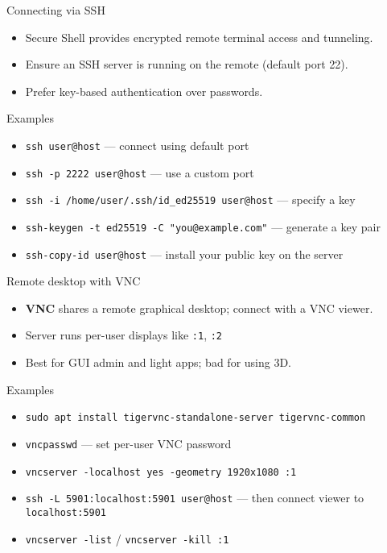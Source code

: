 \documentclass{beamer}
\begin{document}
\begin{frame}{Connecting via SSH}
  \begin{itemize}
    \item Secure Shell provides encrypted remote terminal access and tunneling.
    \item Ensure an SSH server is running on the remote (default port 22).
    \item Prefer key-based authentication over passwords.
  \end{itemize}
  \begin{exampleblock}{Examples}
    \begin{itemize}
      \item \texttt{ssh user@host} — connect using default port
      \item \texttt{ssh -p 2222 user@host} — use a custom port
      \item \texttt{ssh -i /home/user/.ssh/id\_ed25519 user@host} — specify a key
      \item \texttt{ssh-keygen -t ed25519 -C "you@example.com"} — generate a key pair
      \item \texttt{ssh-copy-id user@host} — install your public key on the server
    \end{itemize}
  \end{exampleblock}
\end{frame}

\begin{frame}{Remote desktop with VNC}
  \begin{itemize}
    \item \textbf{VNC} shares a remote graphical desktop; connect with a VNC viewer.
    \item Server runs per-user displays like \texttt{:1}, \texttt{:2}
    \item Best for GUI admin and light apps; bad for using 3D.
  \end{itemize}
  \begin{exampleblock}{Examples}
    \begin{itemize}
      \item \texttt{sudo apt install tigervnc-standalone-server tigervnc-common}
      \item \texttt{vncpasswd} — set per-user VNC password
      \item \texttt{vncserver -localhost yes -geometry 1920x1080 :1}
      \item \texttt{ssh -L 5901:localhost:5901 user@host} — then connect viewer to \texttt{localhost:5901}
      \item \texttt{vncserver -list} / \texttt{vncserver -kill :1}
    \end{itemize}
  \end{exampleblock}
\end{frame}
\end{document}
